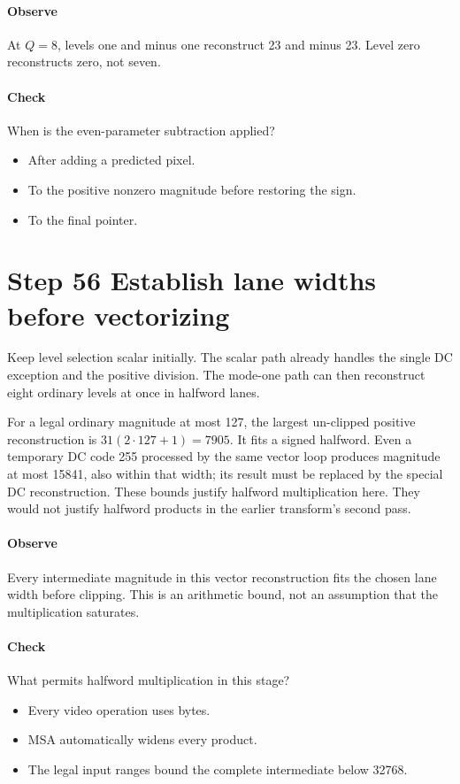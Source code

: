 \paragraph{Observe} At $Q=8$, levels one and minus one reconstruct 23 and
minus 23. Level zero reconstructs zero, not seven.
\paragraph{Check} When is the even-parameter subtraction applied?
\begin{itemize}
  \item[A.] After adding a predicted pixel.
  \item[B.] To the positive nonzero magnitude before restoring the sign.
  \item[C.] To the final pointer.
\end{itemize}

\section{Step 56 Establish lane widths before vectorizing}\label{h263-quant-s06}
Keep level selection scalar initially. The scalar path already handles the
single DC exception and the positive division. The mode-one path can then
reconstruct eight ordinary levels at once in halfword lanes.

For a legal ordinary magnitude at most 127, the largest un-clipped positive
reconstruction is $31(2\cdot127+1)=7905$. It fits a signed halfword. Even a
temporary DC code 255 processed by the same vector loop produces magnitude at
most 15841, also within that width; its result must be replaced by the special
DC reconstruction. These bounds justify halfword multiplication here. They would
not justify halfword products in the earlier transform's second pass.

\paragraph{Observe} Every intermediate magnitude in this vector reconstruction
fits the chosen lane width before clipping. This is an arithmetic bound, not an
assumption that the multiplication saturates.
\paragraph{Check} What permits halfword multiplication in this stage?
\begin{itemize}
  \item[A.] Every video operation uses bytes.
  \item[B.] MSA automatically widens every product.
  \item[C.] The legal input ranges bound the complete intermediate below 32768.
\end{itemize}

